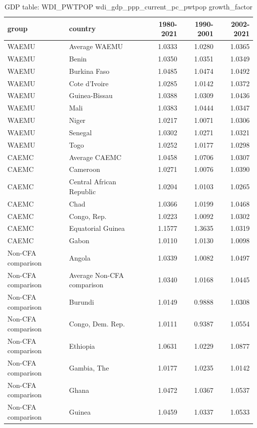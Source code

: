 \begin{table}

\caption{GDP table: WDI_PWTPOP wdi_gdp_ppp_current_pc_pwtpop growth_factor}
\centering
\begin{tabular}[t]{llrrr}
\toprule
group & country & 1980-2021 & 1990-2001 & 2002-2021\\
\midrule
WAEMU & Average WAEMU & 1.0333 & 1.0280 & 1.0365\\
WAEMU & Benin & 1.0350 & 1.0351 & 1.0349\\
WAEMU & Burkina Faso & 1.0485 & 1.0474 & 1.0492\\
WAEMU & Cote d'Ivoire & 1.0285 & 1.0142 & 1.0372\\
WAEMU & Guinea-Bissau & 1.0388 & 1.0309 & 1.0436\\
\addlinespace
WAEMU & Mali & 1.0383 & 1.0444 & 1.0347\\
WAEMU & Niger & 1.0217 & 1.0071 & 1.0306\\
WAEMU & Senegal & 1.0302 & 1.0271 & 1.0321\\
WAEMU & Togo & 1.0252 & 1.0177 & 1.0298\\
CAEMC & Average CAEMC & 1.0458 & 1.0706 & 1.0307\\
\addlinespace
CAEMC & Cameroon & 1.0271 & 1.0076 & 1.0390\\
CAEMC & Central African Republic & 1.0204 & 1.0103 & 1.0265\\
CAEMC & Chad & 1.0366 & 1.0199 & 1.0468\\
CAEMC & Congo, Rep. & 1.0223 & 1.0092 & 1.0302\\
CAEMC & Equatorial Guinea & 1.1577 & 1.3635 & 1.0319\\
\addlinespace
CAEMC & Gabon & 1.0110 & 1.0130 & 1.0098\\
Non-CFA comparison & Angola & 1.0339 & 1.0082 & 1.0497\\
Non-CFA comparison & Average Non-CFA comparison & 1.0340 & 1.0168 & 1.0445\\
Non-CFA comparison & Burundi & 1.0149 & 0.9888 & 1.0308\\
Non-CFA comparison & Congo, Dem. Rep. & 1.0111 & 0.9387 & 1.0554\\
\addlinespace
Non-CFA comparison & Ethiopia & 1.0631 & 1.0229 & 1.0877\\
Non-CFA comparison & Gambia, The & 1.0177 & 1.0235 & 1.0142\\
Non-CFA comparison & Ghana & 1.0472 & 1.0367 & 1.0537\\
Non-CFA comparison & Guinea & 1.0459 & 1.0337 & 1.0533\\

\end{tabular}
\end{table}
